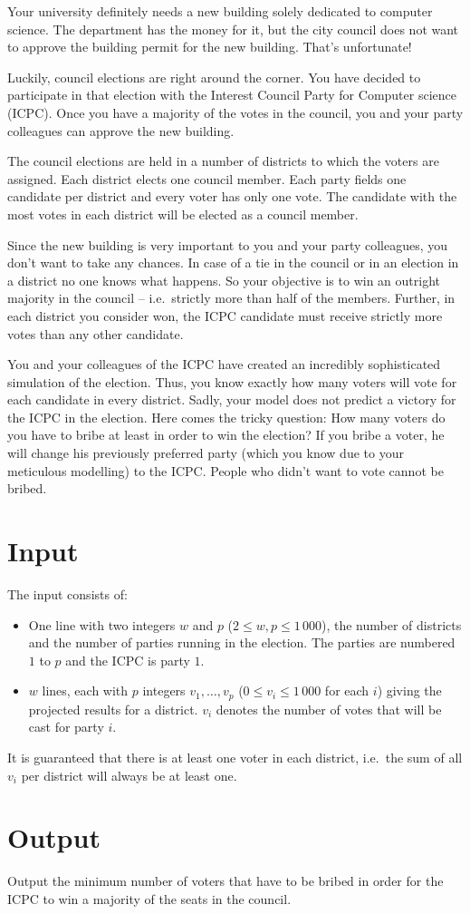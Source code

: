 
Your university definitely needs a new building solely dedicated to computer science.
The department has the money for it, but the city council does not want to approve the building permit for the new building.
That's unfortunate!

Luckily, council elections are right around the corner.
You have decided to participate in that election with the Interest Council Party for Computer science (ICPC).
Once you have a majority of the votes in the council, you and your party colleagues can approve the new building.


The council elections are held in a number of districts to which the voters are assigned.
Each district elects one council member.
Each party fields one candidate per district and every voter has only one vote.
The candidate with the most votes in each district will be elected as a council member.


Since the new building is very important to you and your party colleagues, you don't want to take any chances.
In case of a tie in the council or in an election in a district no one knows what happens.
So your objective is to win an outright majority in the council -- i.e.\ strictly more than half of the members.
Further, in each district you consider won, the ICPC candidate must receive strictly more votes than any other candidate.


You and your colleagues of the ICPC have created an incredibly sophisticated simulation of the election.
Thus, you know exactly how many voters will vote for each candidate in every district.
Sadly, your model does not predict a victory for the ICPC in the election.
Here comes the tricky question: How many voters do you have to bribe at least in order to win the election?
If you bribe a voter, he will change his previously preferred party (which you know due to your meticulous modelling) to the ICPC.
People who didn't want to vote cannot be bribed. 


\section*{Input}
The input consists of:
\begin{itemize}
  \item One line with two integers $w$ and $p$ ($2 \leq w,p \leq 1\,000$), the number of districts and the number of parties running in the election.
The parties are numbered $1$ to $p$ and the ICPC is party $1$.
  \item $w$ lines, each with $p$ integers $v_1, \dots, v_p$ ($0 \leq v_i \leq 1\,000$ for each $i$) giving the projected results for a district.
    $v_i$ denotes the number of votes that will be cast for party $i$.
\end{itemize}

It is guaranteed that there is at least one voter in each district, i.e.\ the sum of all $v_i$ per district will always be at least one.

\section*{Output}
Output the minimum number of voters that have to be bribed in order for the ICPC to win a majority of the seats in the council.
